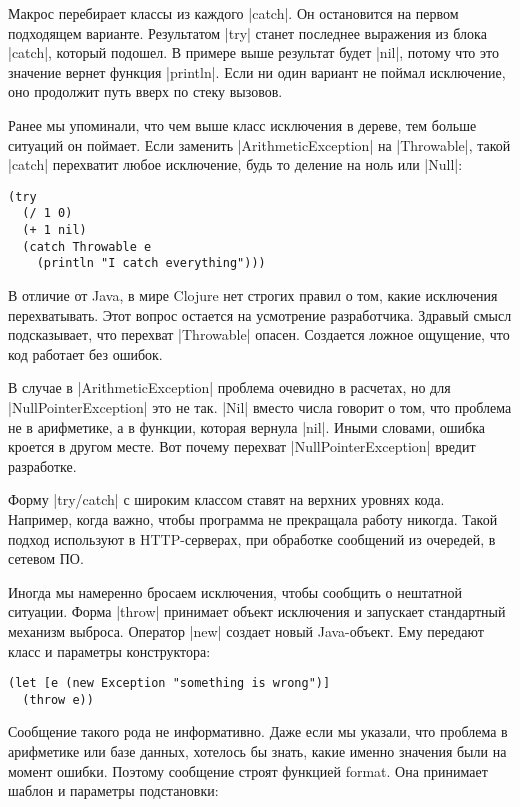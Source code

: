 Макрос перебирает классы из каждого \spverb|catch|. Он остановится на первом подходящем
варианте. Результатом \spverb|try| станет последнее выражения из блока \spverb|catch|, который
подошел. В примере выше результат будет \spverb|nil|, потому что это значение вернет
функция \spverb|println|. Если ни один вариант не поймал исключение, оно продолжит путь
вверх по стеку вызовов.

Ранее мы упоминали, что чем выше класс исключения в дереве, тем больше ситуаций
он поймает. Если заменить \spverb|ArithmeticException| на \spverb|Throwable|, такой \spverb|catch|
перехватит любое исключение, будь то деление на ноль или \spverb|Null|:

\begin{verbatim}
(try
  (/ 1 0)
  (+ 1 nil)
  (catch Throwable e
    (println "I catch everything")))
\end{verbatim}

В отличие от Java, в мире Clojure нет строгих правил о том, какие исключения
перехватывать. Этот вопрос остается на усмотрение разработчика. Здравый смысл
подсказывает, что перехват \spverb|Throwable| опасен. Создается ложное ощущение, что
код работает без ошибок.

В случае в \spverb|ArithmeticException| проблема очевидно в расчетах, но для
\spverb|NullPointerException| это не так. \spverb|Nil| вместо числа говорит о том, что
проблема не в арифметике, а в функции, которая вернула \spverb|nil|. Иными словами,
ошибка кроется в другом месте. Вот почему перехват \spverb|NullPointerException| вредит
разработке.

Форму \spverb|try/catch| с широким классом ставят на верхних уровнях кода. Например,
когда важно, чтобы программа не прекращала работу никогда. Такой подход
используют в HTTP-серверах, при обработке сообщений из очередей, в сетевом ПО.

Иногда мы намеренно бросаем исключения, чтобы сообщить о нештатной
ситуации. Форма \spverb|throw| принимает объект исключения и запускает стандартный
механизм выброса. Оператор \spverb|new| создает новый Java-объект. Ему передают класс и
параметры конструктора:

\begin{verbatim}
(let [e (new Exception "something is wrong")]
  (throw e))
\end{verbatim}

Сообщение такого рода не информативно. Даже если мы указали, что проблема в
арифметике или базе данных, хотелось бы знать, какие именно значения были на
момент ошибки. Поэтому сообщение строят функцией format. Она принимает шаблон и
параметры подстановки:

